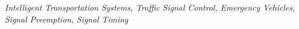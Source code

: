 

{} \textit{Intelligent Transportation Systems, Traffic Signal Control, Emergency Vehicles, Signal Preemption, Signal Timing}